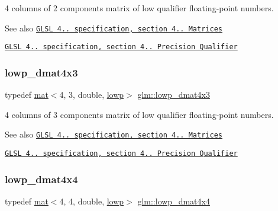 4 columns of 2 components matrix of low qualifier floating-\/point numbers.

\begin{DoxySeeAlso}{See also}
\href{http://www.opengl.org/registry/doc/GLSLangSpec.4.20.8.pdf}{\tt G\+L\+SL 4.. specification, section 4.. Matrices} 

\href{http://www.opengl.org/registry/doc/GLSLangSpec.4.20.8.pdf}{\tt G\+L\+SL 4.. specification, section 4.. Precision Qualifier} 
\end{DoxySeeAlso}
\mbox{\label{group__core__precision_gaf829f4341a7592475df926eb9b416dd4}} 
\subsubsection{\texorpdfstring{lowp\+\_\+dmat4x3}{lowp\_dmat4x3}}
{\footnotesize\ttfamily typedef \hyperlink{structglm_1_1mat}{mat}$<$4, 3, double, \hyperlink{namespaceglm_a36ed105b07c7746804d7fdc7cc90ff25ae161af3fc695e696ce3bf69f7332bc2d}{lowp}$>$ \hyperlink{group__core__precision_gaf829f4341a7592475df926eb9b416dd4}{glm\+::lowp\+\_\+dmat4x3}}

4 columns of 3 components matrix of low qualifier floating-\/point numbers.

\begin{DoxySeeAlso}{See also}
\href{http://www.opengl.org/registry/doc/GLSLangSpec.4.20.8.pdf}{\tt G\+L\+SL 4.. specification, section 4.. Matrices} 

\href{http://www.opengl.org/registry/doc/GLSLangSpec.4.20.8.pdf}{\tt G\+L\+SL 4.. specification, section 4.. Precision Qualifier} 
\end{DoxySeeAlso}
\mbox{\label{group__core__precision_ga336afc91799f59d9075eb94c3093612f}} 
\subsubsection{\texorpdfstring{lowp\+\_\+dmat4x4}{lowp\_dmat4x4}}
{\footnotesize\ttfamily typedef \hyperlink{structglm_1_1mat}{mat}$<$4, 4, double, \hyperlink{namespaceglm_a36ed105b07c7746804d7fdc7cc90ff25ae161af3fc695e696ce3bf69f7332bc2d}{lowp}$>$ \hyperlink{group__core__precision_ga336afc91799f59d9075eb94c3093612f}{glm\+::lowp\+\_\+dmat4x4}}

